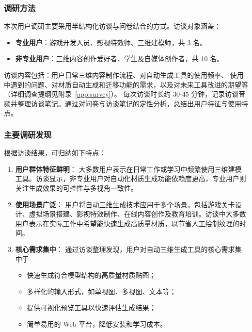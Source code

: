 \subsubsection{调研方法}

本次用户调研主要采用半结构化访谈与问卷结合的方式。访谈对象涵盖：

\begin{itemize}
  \item \textbf{专业用户}：游戏开发人员、影视特效师、三维建模师，共 3 名。
  \item \textbf{非专业用户}：三维内容创作爱好者、学生及自媒体创作者，共 10 名。
\end{itemize}

访谈内容包括：用户日常三维内容制作流程、对自动生成工具的使用频率、
使用中遇到的问题、对材质自动生成和迁移功能的需求，以及对未来工具改进的期望等
（详细调查提纲见附录~\ref{app:survey}）。
每次访谈时长约 30-45 分钟，记录访谈音频并整理访谈笔记。通过对问卷与访谈笔记的定性分析，总结出用户特征与使用特点。

\subsubsection{主要调研发现}

根据访谈结果，可归纳如下特点：

\begin{enumerate}
  \item \textbf{用户群体特征鲜明}：  
  大多数用户表示在日常工作或学习中频繁使用三维建模工具。访谈显示，非专业用户对自动化材质生成功能依赖度更高，专业用户则关注生成效果的可控性与多视角一致性。

  \item \textbf{使用场景广泛}：  
  用户将自动三维生成技术应用于多个场景，包括游戏关卡设计、虚拟场景搭建、影视特效制作、在线内容创作及教育培训。访谈中大多数用户表示在实际工作中希望能快速生成高质量材质，以节省人工绘制纹理的时间。

  \item \textbf{核心需求集中}：  
  通过访谈整理发现，用户对自动三维生成工具的核心需求集中于
  \begin{itemize}
    \item 快速生成符合模型结构的高质量材质贴图；
    \item 多样化的输入形式，如单视图、多视图、文本等；
    \item 提供可视化预览工具以快速评估生成结果；
    \item 简单易用的 Web 平台，降低安装和学习成本。
  \end{itemize}
\end{enumerate}


